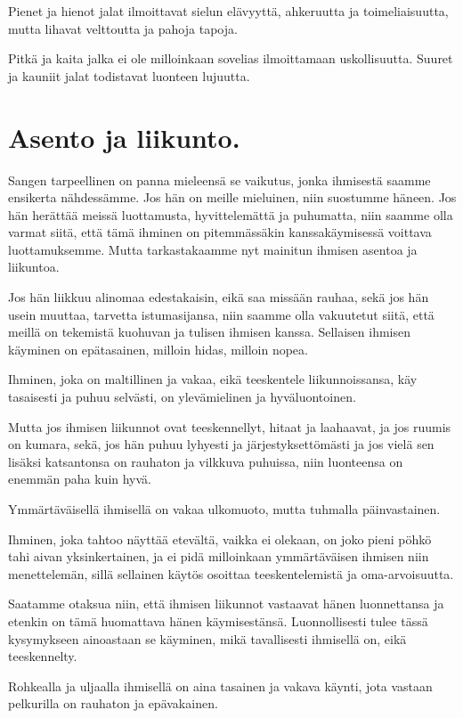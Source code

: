 \documentclass[11pt, twoside, finnish, a5paper]{book}
\begin{document}
Pienet ja hienot jalat ilmoittavat sielun elävyyttä,
ahkeruutta ja toimeliaisuutta, mutta lihavat velttoutta ja
pahoja tapoja.

Pitkä ja kaita jalka ei ole milloinkaan sovelias ilmoittamaan
uskollisuutta. Suuret ja kauniit jalat todistavat luonteen lujuutta.

\chapter*{Asento ja liikunto.}

Sangen tarpeellinen on panna mieleensä se vaikutus,
jonka ihmisestä saamme ensikerta nähdessämme. Jos
hän on meille mieluinen, niin suostumme häneen. Jos
hän herättää meissä luottamusta, hyvittelemättä ja
puhumatta, niin saamme olla varmat siitä, että tämä ihminen
on pitemmässäkin kanssakäymisessä voittava luottamuksemme.
Mutta tarkastakaamme nyt mainitun ihmisen
asentoa ja liikuntoa.

Jos hän liikkuu alinomaa edestakaisin, eikä saa
missään rauhaa, sekä jos hän usein muuttaa, tarvetta
istumasijansa, niin saamme olla vakuutetut siitä, että meillä on
tekemistä kuohuvan ja tulisen ihmisen kanssa. Sellaisen
ihmisen käyminen on epätasainen, milloin hidas, milloin nopea.

Ihminen, joka on maltillinen ja vakaa, eikä teeskentele
liikunnoissansa, käy tasaisesti ja puhuu selvästi,
on ylevämielinen ja hyväluontoinen.

Mutta jos ihmisen liikunnot ovat teeskennellyt, hitaat
ja laahaavat, ja jos ruumis on kumara, sekä, jos hän
puhuu lyhyesti ja järjestyksettömästi ja jos vielä sen
lisäksi katsantonsa on rauhaton ja vilkkuva puhuissa,
niin luonteensa on enemmän paha kuin hyvä.

Ymmärtäväisellä ihmisellä on vakaa ulkomuoto, mutta
tuhmalla päinvastainen.

Ihminen, joka tahtoo näyttää etevältä, vaikka ei olekaan,
on joko pieni pöhkö tahi aivan yksinkertainen, ja
ei pidä milloinkaan ymmärtäväisen ihmisen niin menettelemän,
sillä sellainen käytös osoittaa teeskentelemistä
ja oma-arvoisuutta.

Saatamme otaksua niin, että ihmisen liikunnot vastaavat
hänen luonnettansa ja etenkin on tämä huomattava hänen
käymisestänsä.
Luonnollisesti tulee tässä kysymykseen
ainoastaan se käyminen, mikä tavallisesti
ihmisellä on, eikä teeskennelty.

Rohkealla ja uljaalla ihmisellä
on aina tasainen ja vakava käynti,
jota vastaan pelkurilla on rauhaton ja
epävakainen.
 
\end{document}
